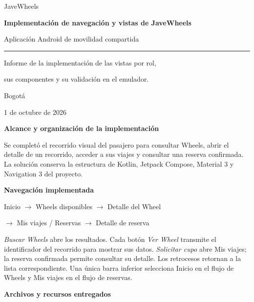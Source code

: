 \documentclass[11pt,a4paper]{article}
\newcommand{\tituloPagina}[1]{%
  {\Large\bfseries\color{azulJW}#1}\par\medskip
}
\begin{document}
\thispagestyle{empty}
\vspace*{3cm}
{\large\color{grisJW}JaveWheels\par}
\vspace{0.7cm}
{\Huge\bfseries\color{azulJW}Implementación de navegación y vistas de JaveWheels\par}
\vspace{0.7cm}
{\large Aplicación Android de movilidad compartida\par}
\vspace{1.3cm}
\rule{\textwidth}{0.5pt}
\vspace{0.5cm}
{\large Informe de la implementación de las vistas por rol,\par
sus componentes y su validación en el emulador.\par}
\vfill
{\large Bogotá\par 1 de octubre de 2026\par}
\clearpage

\tituloPagina{Alcance y organización de la implementación}

Se completó el recorrido visual del pasajero para consultar Wheels, abrir el
detalle de un recorrido, acceder a sus viajes y consultar una reserva confirmada.
La solución conserva la estructura de Kotlin, Jetpack Compose, Material 3 y
Navigation 3 del proyecto.

\textbf{Navegación implementada}

\begin{center}
\color{azulJW}
Inicio $\rightarrow$ Wheels disponibles $\rightarrow$ Detalle del Wheel\par
\smallskip
$\rightarrow$ Mis viajes / Reservas $\rightarrow$ Detalle de reserva
\end{center}

\emph{Buscar Wheels} abre los resultados. Cada botón \emph{Ver Wheel} transmite
el identificador del recorrido para mostrar sus datos. \emph{Solicitar cupo}
abre Mis viajes; la reserva confirmada permite consultar su detalle.
Los retrocesos retornan a la lista correspondiente. Una única barra inferior
selecciona Inicio en el flujo de Wheels y Mis viajes en el flujo de reservas.

\textbf{Archivos y recursos entregados}
\end{document}
